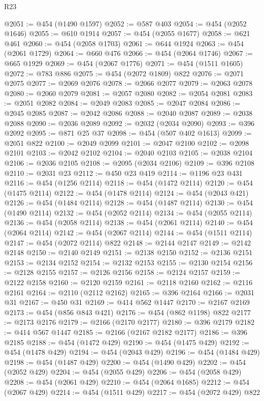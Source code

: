 \begin{lexlean}{R23}
\begin{coremodule}
{{{{{{{{{{{{{{{{{{{{{{{{{{{{{{{{{{{{{{{{{{{{{{{{{{{{{{{{{{{{{{{{{{{{{{{{{{{{{{{{{{{{{{{{{{{{{@2051 := @454 (@1490 @1597)
@2052 := @587 @403
@2054 := @454 (@2052 @1646)
@2055 := @610 @1914
@2057 := @454 (@2055 @1677)
@2058 := @621 @461
@2060 := @454 (@2058 @1703)
@2061 := @644 @1924
@2063 := @454 (@2061 @1729)
@2064 := @660 @476
@2066 := @454 (@2064 @1746)
@2067 := @665 @1929
@2069 := @454 (@2067 @1776)
@2071 := @454 (@1511 @1605)
@2072 := @783 @886
@2075 := @454 (@2072 @1809) @822
@2076 := @2071 @2075
@2077 := @2069 @2076
@2078 := @2066 @2077
@2079 := @2063 @2078
@2080 := @2060 @2079
@2081 := @2057 @2080
@2082 := @2054 @2081
@2083 := @2051 @2082
@2084 := @2049 @2083
@2085 := @2047 @2084
@2086 := @2045 @2085
@2087 := @2042 @2086
@2088 := @2040 @2087
@2089 := @2038 @2088
@2090 := @2036 @2089
@2092 := @2032 (@2034 @2090)
@2093 := @396 @2092
@2095 := @871 @25 @37
@2098 := @454 (@507 @402 @1613)
@2099 := @2051 @822
@2100 := @2049 @2099
@2101 := @2047 @2100
@2102 := @2098 @2101
@2103 := @2042 @2102
@2104 := @2040 @2103
@2105 := @2038 @2104
@2106 := @2036 @2105
@2108 := @2095 (@2034 @2106)
@2109 := @396 @2108
@2110 := @2031 @23
@2112 := @450 @23 @419
@2114 := @1196 @23 @431
@2116 := @454 (@1256 @2114)
@2118 := @454 (@1472 @2114)
@2120 := @454 (@1475 @2114)
@2122 := @454 (@1478 @2114)
@2124 := @454 (@2043 @421)
@2126 := @454 (@1484 @2114)
@2128 := @454 (@1487 @2114)
@2130 := @454 (@1490 @2114)
@2132 := @454 (@2052 @2114)
@2134 := @454 (@2055 @2114)
@2136 := @454 (@2058 @2114)
@2138 := @454 (@2061 @2114)
@2140 := @454 (@2064 @2114)
@2142 := @454 (@2067 @2114)
@2144 := @454 (@1511 @2114)
@2147 := @454 (@2072 @2114) @822
@2148 := @2144 @2147
@2149 := @2142 @2148
@2150 := @2140 @2149
@2151 := @2138 @2150
@2152 := @2136 @2151
@2153 := @2134 @2152
@2154 := @2132 @2153
@2155 := @2130 @2154
@2156 := @2128 @2155
@2157 := @2126 @2156
@2158 := @2124 @2157
@2159 := @2122 @2158
@2160 := @2120 @2159
@2161 := @2118 @2160
@2162 := @2116 @2161
@2164 := @2110 (@2112 @2162)
@2165 := @396 @2164
@2166 := @2031 @31
@2167 := @450 @31
@2169 := @414 @562 @1447
@2170 := @2167 @2169
@2173 := @454 (@856 @843 @421)
@2176 := @454 (@862 @1198) @822
@2177 := @2173 @2176
@2179 := @2166 (@2170 @2177)
@2180 := @396 @2179
@2182 := @414 @567 @1447
@2185 := @2166 (@2167 @2182 @2177)
@2186 := @396 @2185
@2188 := @454 (@1472 @429)
@2190 := @454 (@1475 @429)
@2192 := @454 (@1478 @429)
@2194 := @454 (@2043 @429)
@2196 := @454 (@1484 @429)
@2198 := @454 (@1487 @429)
@2200 := @454 (@1490 @429)
@2202 := @454 (@2052 @429)
@2204 := @454 (@2055 @429)
@2206 := @454 (@2058 @429)
@2208 := @454 (@2061 @429)
@2210 := @454 (@2064 @1685)
@2212 := @454 (@2067 @429)
@2214 := @454 (@1511 @429)
@2217 := @454 (@2072 @429) @822
}}}}}}}}}}}}}}}}}}}}}}}}}}}}}}}}}}}}}}}}}}}}}}}}}}}}}}}}}}}}}}}}}}}}}}}}}}}}}}}}}}}}}}}}}}}}}
\end{coremodule}
\end{lexlean}
